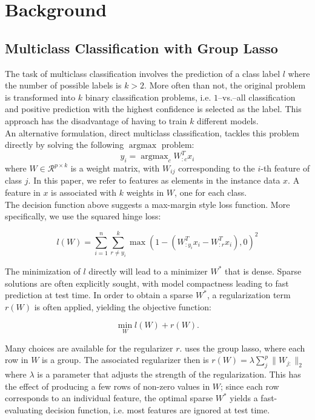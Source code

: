 \documentclass[11pt]{article}
\begin{document}
\section{Background}


\subsection{Multiclass Classification with Group Lasso}

The task of multiclass classification involves the prediction of a class label
$l$ where the number of possible labels is $k>2$. More often than not, the 
original problem is transformed into $k$ binary classification problems, i.e.
$1$--vs.--all classification and positive prediction with the highest 
confidence is selected as the label. This approach has the disadvantage of
having to train $k$ different models.\\

An alternative formulation, direct multiclass classification, tackles this 
problem directly by solving the following $\operatorname{argmax}$ problem:
$$y_i = \operatorname{argmax}_c W_{:c}^T x_i $$
where $W \in \mathcal{R}^{p \times k}$ is a weight matrix, with $W_{ij}$
corresponding to the $i$-th feature of class $j$. In this paper, we refer
to features as elements in the instance data $x$. A feature in $x$ is
associated with $k$ weights in $W$, one for each class.\\

The decision function above suggests a max-margin style loss function. More
specifically, we use the squared hinge loss:

$$ l(W) = \sum_{i=1}^n \sum_{r\ne y_i}^k 
    \max\left(1 - (W_{:y_i}^Tx_i - W_{:r}^Tx_i), 0\right)^2 $$

The minimization of $l$ directly will lead to a minimizer $W^*$ that is
dense. Sparse solutions are often explicitly sought, with model compactness
leading to fast prediction at test time. In order to obtain a sparse $W^*$,
a regularization term $r(W)$ is often applied, yielding the objective 
function:

$$\min_W l(W) + r(W).$$

Many choices are available for the regularizer $r$. \cite{blondel2013block} uses
the group lasso, where each row in $W$ is a group. The associated regularizer 
then is $r(W) = \lambda\sum_j^p \|W_{j:}\|_2$ where $\lambda$ is a parameter
that adjusts the strength of the regularization.
This has the effect of producing a few rows of non-zero values in $W$;
since each row corresponds to an individual feature, the optimal sparse $W^*$
yields a fast-evaluating decision function, i.e. most features are 
ignored at test time.\\
\end{document}
